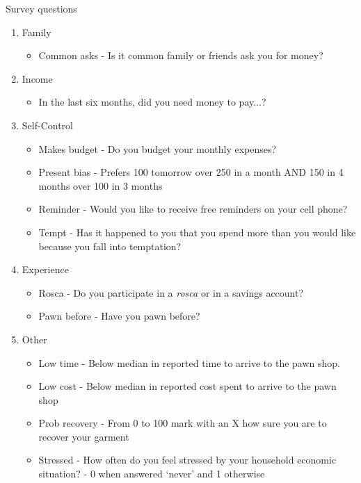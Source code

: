 \documentclass[9pt]{beamer}
\begin{document}
\begin{frame}{Survey questions}
    \begin{enumerate}
        \item Family
            \begin{itemize}
                \item Common asks - Is it common family or friends ask you for money?
            \end{itemize}
        \item Income 
        \begin{itemize}
            \item In the last six months, did you need money to pay...?
        \end{itemize}
        \item Self-Control
        \begin{itemize}
            \item Makes budget - Do you budget your monthly expenses?
            \item Present bias - Prefers 100 tomorrow over 250 in a month AND 150 in 4 months over 100 in 3 months
            \item Reminder - Would you like to receive free reminders on your cell phone?
            \item Tempt - Has it happened to you that you spend more than you would like because you fall into temptation?
        \end{itemize}
        \item Experience
        \begin{itemize}
            \item Rosca - Do you participate in a \textit{rosca} or in a savings account?
            \item Pawn before - Have you pawn before?
        \end{itemize}
        \item Other
            \begin{itemize}
            \item Low time - Below median in reported time to arrive to the pawn shop.
            \item Low cost - Below median in reported cost spent to arrive to the pawn shop
            \item Prob recovery - From 0 to 100 mark with an X how sure you are to recover your garment
            \item Stressed - How often do you feel stressed by your household economic situation? - 0 when answered `never' and 1 otherwise
        \end{itemize}
    \end{enumerate}
\end{frame}
\end{document}
